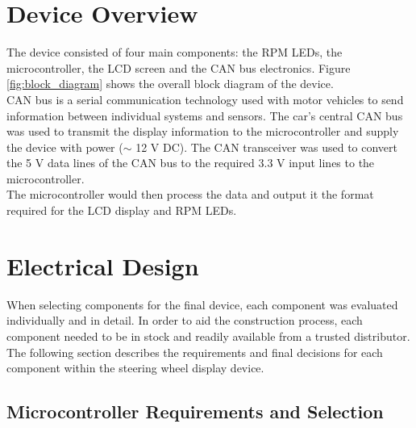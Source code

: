 \documentclass[a4paper,12pt]{article}
\begin{document}

\newpage
\section{Device Overview}
\label{sec:device_overview}

The device consisted of four main components: the RPM LEDs, the microcontroller, the LCD screen and the CAN bus electronics. Figure \ref{fig:block_diagram} shows the overall block diagram of the device. \\



CAN bus is a serial communication technology used with motor vehicles to send information between individual systems and sensors. The car's central CAN bus was used to transmit the display information to the microcontroller and supply the device with power ($\sim$ 12 V DC). The CAN transceiver was used to convert the 5 V data lines of the CAN bus to the required 3.3 V input lines to the microcontroller. \\

The microcontroller would then process the data and output it the format required for the LCD display and RPM LEDs. \\


\newpage
\section{Electrical Design}
\label{sec:electrical_design}

When selecting components for the final device, each component was evaluated individually and in detail. In order to aid the construction process, each component needed to be in stock and readily available from a trusted distributor. The following section describes the requirements and final decisions for each component within the steering wheel display device. \\

\subsection{Microcontroller Requirements and Selection}
\label{sec:microcontroller}
\end{document}
